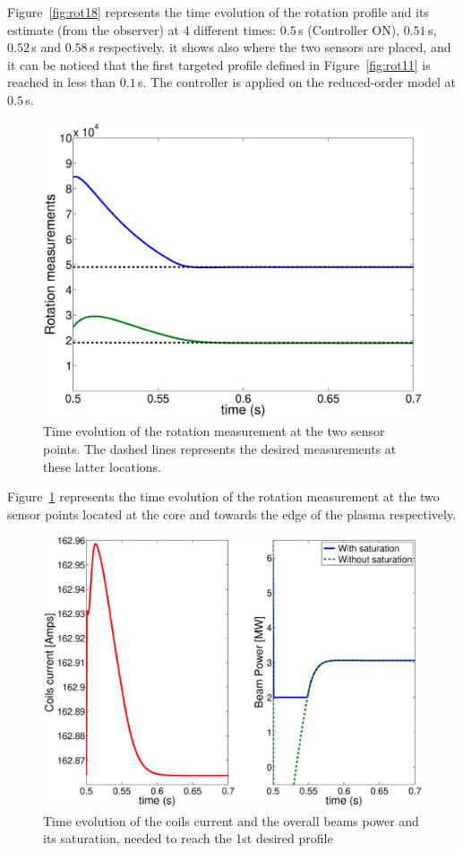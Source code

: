 \documentclass[12pt]{iopart}
\begin{document}
Figure~\ref{fig:rot18} represents the time evolution of the rotation profile and its estimate (from the observer) at 4 different times: $0.5$\,s (Controller ON), $0.51$\,s, $0.52$\,s and $0.58$\,s respectively. it shows also where the two sensors are placed, and it can be noticed that the first targeted profile defined in Figure~\ref{fig:rot11} is reached in less than $0.1$\,s. The controller is applied on the reduced-order model at $0.5$\,s.
\begin{figure}
\centering
\includegraphics[width=\linewidth]{imene_figs/Goum20} 
\caption{Time evolution of the rotation measurement at the two sensor points. The dashed lines represents the desired measurements at these latter locations. }
\label{fig:rot20}
\end{figure}    

Figure~\ref{fig:rot20} represents the time evolution of the rotation measurement at the two sensor points located at the core and towards the edge of the plasma respectively.  



\begin{figure}
\centering
\includegraphics[width=\linewidth]{imene_figs/Goum19l} 
\caption{Time evolution of the coils current and the overall beams power and its saturation, needed to reach the 1st desired profile }
\label{fig:rot19}
\end{figure} 
\end{document}
